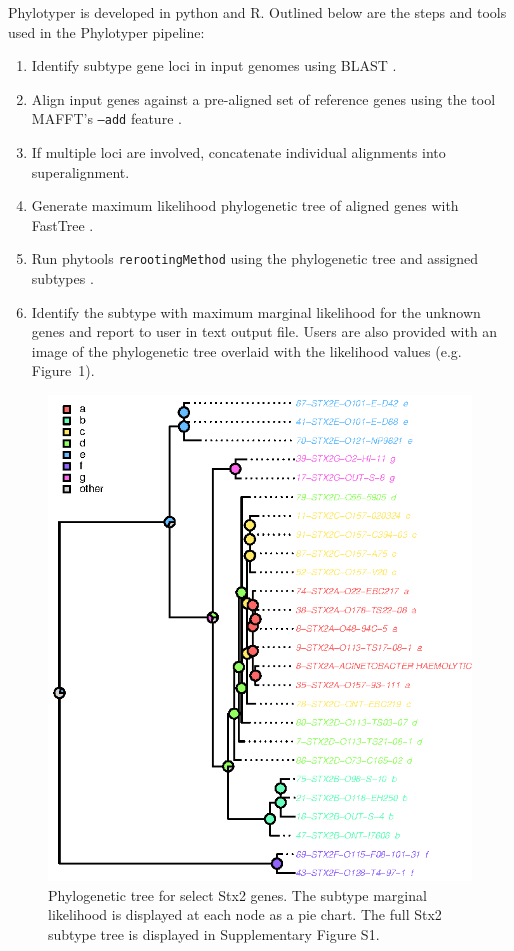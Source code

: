 \documentclass{bioinfo}
\begin{document}
Phylotyper is developed in python and R. 
Outlined below are the steps and tools used in the Phylotyper pipeline:

\begin{enumerate}
\item Identify subtype gene loci in input genomes using BLAST \citep{Camacho2009}.
\item Align input genes against a pre-aligned set of reference genes using the tool MAFFT's \texttt{--add} feature \citep{Katoh2013,CapellaGutierrez2009}.
\item If multiple loci are involved, concatenate individual alignments into superalignment.
\item Generate maximum likelihood phylogenetic tree of aligned genes with FastTree \citep{Price2010}.
\item Run phytools \texttt{rerootingMethod} using the phylogenetic tree and assigned subtypes \citep{Revell2011}.
\item Identify the subtype with maximum marginal likelihood for the unknown genes and report to user in text output file.
Users are also provided with an image of the phylogenetic tree overlaid with the likelihood values (e.g. Figure~1\vphantom{\ref{fig:01}}).
\end{enumerate}

\begin{figure}[!tpb]%
\centerline{\includegraphics{fig01.eps}}
\caption{Phylogenetic tree for select Stx2 genes. 
The subtype marginal likelihood is displayed at each node as a pie chart.
The full Stx2 subtype tree is displayed in Supplementary Figure S1.}\label{fig:01}
\end{figure}
\end{document}
